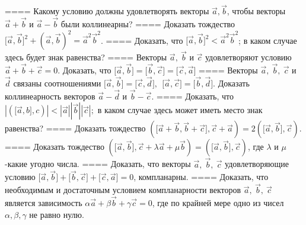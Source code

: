 ====
Какому условию должны удовлетворять векторы \(\overrightarrow{a},\overrightarrow{b}\), чтобы векторы \(\overrightarrow{a} + \overrightarrow{b}\) и \(\overrightarrow{a} - \overrightarrow{b}\) были коллинеарны?
====
Доказать тождество \(\lbrack\overrightarrow{a},\overrightarrow{b}\rbrack^{2} + (\overrightarrow{a},\overrightarrow{b})^{2} = {\overrightarrow{a}}^{2}{\overrightarrow{b}}^{2}\).
====
Доказать, что \(\lbrack\overrightarrow{a},\overrightarrow{b}\rbrack^{2} <  {\overrightarrow{a}}^{2}{\overrightarrow{b}}^{2}\); в каком случае здесь будет знак равенства?
====
Векторы \(\overrightarrow{a},\ \overrightarrow{b}\) и \(\overrightarrow{c}\) удовлетворяют условию \(\overrightarrow{a} + \overrightarrow{b} + \overrightarrow{c} = 0\). Доказать, что \(\lbrack\overrightarrow{a},\overrightarrow{b}\rbrack = \lbrack\overrightarrow{b},\overrightarrow{c}\rbrack = \lbrack\overrightarrow{c},\overrightarrow{a}\rbrack\)
====
Векторы \(\overrightarrow{a},\ \overrightarrow{b},\ \overrightarrow{c}\) и \(\overrightarrow{d}\) связаны соотношениями \(\lbrack\overrightarrow{a},\overrightarrow{b}\rbrack = \lbrack\overrightarrow{c},\overrightarrow{d}\rbrack,\ \ \lbrack\overrightarrow{a},\overrightarrow{c}\rbrack = \lbrack\overrightarrow{b},\overrightarrow{d}\rbrack\). Доказать коллинеарность векторов \(\overrightarrow{a} - \overrightarrow{d}\) и \(\overrightarrow{b} - \overrightarrow{c}\).
====
Доказать, что \(|(\lbrack\overrightarrow{a},b\rbrack,c)| <  |\overrightarrow{a}||\overrightarrow{b}||\overrightarrow{c}|;\) в каком случае здесь может иметь место знак равенства?
====
Доказать тождество \((\lbrack\overrightarrow{a} + \overrightarrow{b},\overrightarrow{b} + \overrightarrow{c}\rbrack,\overrightarrow{c} + \overrightarrow{a}) = 2(\lbrack\overrightarrow{a},\overrightarrow{b}\rbrack,\overrightarrow{c})\).
====
Доказать тождество \((\lbrack\overrightarrow{a},\overrightarrow{b}\rbrack,\overrightarrow{c} + \lambda\overrightarrow{a} + \mu\overrightarrow{b}) = (\lbrack\overrightarrow{a},\overrightarrow{b}\rbrack,\overrightarrow{c})\), где \(\lambda\) и \(\mu\)-какие угодно числа.
====
Доказать, что векторы \(\overrightarrow{a},\ \overrightarrow{b},\ \overrightarrow{c}\) удовлетворяющие условию \(\lbrack\overrightarrow{a},\overrightarrow{b}\rbrack + \lbrack\overrightarrow{b},\overrightarrow{c}\rbrack + \lbrack\overrightarrow{c},\overrightarrow{a}\rbrack = 0\), компланарны.
====
Доказать, что необходимым и достаточным условием компланарности векторов \(\overrightarrow{a},\ \overrightarrow{b},\ \overrightarrow{c}\) является зависимость \(\alpha\overrightarrow{a} + \beta\overrightarrow{b} + \gamma\overrightarrow{c} = 0\), где по крайней мере одно из чисел \(\alpha,\beta,\gamma\) не равно нулю.